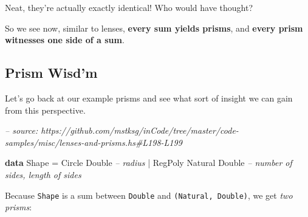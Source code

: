 \documentclass[]{article}
\newenvironment{Shaded}{}{}
\newcommand{\CommentTok}[1]{\textcolor[rgb]{0.38,0.63,0.69}{\textit{#1}}}
\newcommand{\DataTypeTok}[1]{\textcolor[rgb]{0.56,0.13,0.00}{#1}}
\newcommand{\FunctionTok}[1]{\textcolor[rgb]{0.02,0.16,0.49}{#1}}
\newcommand{\KeywordTok}[1]{\textcolor[rgb]{0.00,0.44,0.13}{\textbf{#1}}}
\begin{document}
Neat, they're actually exactly identical! Who would have thought?

So we see now, similar to lenses, \textbf{every sum yields prisms}, and
\textbf{every prism witnesses one side of a sum}.

\hypertarget{prism-wisdm}{%
\subsection{Prism Wisd'm}\label{prism-wisdm}}

Let's go back at our example prisms and see what sort of insight we can gain
from this perspective.

\begin{Shaded}
\begin{Highlighting}[]
\CommentTok{-- source: https://github.com/mstksg/inCode/tree/master/code-samples/misc/lenses-and-prisms.hs#L198-L199}

\KeywordTok{data} \DataTypeTok{Shape} \FunctionTok{=} \DataTypeTok{Circle}  \DataTypeTok{Double}           \CommentTok{-- radius}
           \FunctionTok{|} \DataTypeTok{RegPoly} \DataTypeTok{Natural} \DataTypeTok{Double}   \CommentTok{-- number of sides, length of sides}
\end{Highlighting}
\end{Shaded}

Because \texttt{Shape} is a sum between \texttt{Double} and
\texttt{(Natural,\ Double)}, we get \emph{two prisms}:
\end{document}
